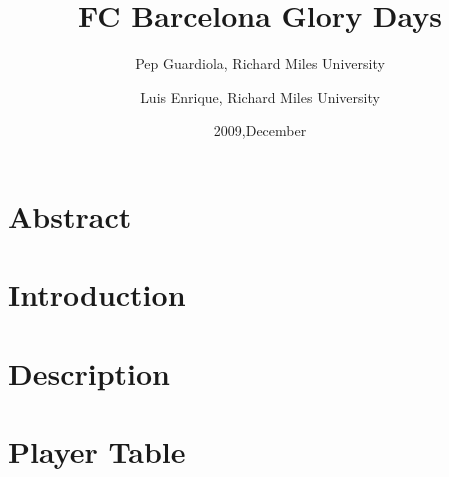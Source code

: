 \documentclass[12pt]{article}
\title{FC Barcelona Glory Days }
\date{2009,December}
\author{Pep Guardiola, Richard Miles University 
\and 
Luis Enrique, Richard Miles University }
\begin{document}
\maketitle  %

\newpage    %


\tableofcontents

\listoffigures

\listoftables

\newpage

\section*{Abstract}


\section{Introduction}


\section{Description}


\section{Player Table}

\end{document}
